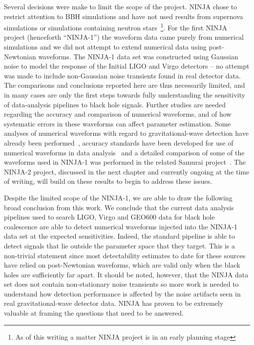 Several decisions were make to limit the scope of the project.  NINJA
chose to restrict attention to BBH simulations and have not used
results from supernova simulations or simulations containing neutron
stars~\footnote{As of this writing a matter NINJA project is in an
early planning stage}.  For the first NINJA project (henceforth
``NINJA-1'') the waveform data came purely from numerical simulations
and we did not attempt to extend numerical data using post-Newtonian
waveforms.  The NINJA-1 data set was constructed using Gaussian noise
to model the response of the Initial LIGO and Virgo detectors -- no
attempt was made to include non-Gaussian noise transients found in
real detector data.  The comparisons and conclusions reported here are
thus necessarily limited, and in many cases are only the first steps
towards fully understanding the sensitivity of data-analysis pipelines
to black hole signals.  Further studies are needed regarding the
accuracy and comparison of numerical waveforms, and of how systematic
errors in these waveforms can affect parameter estimation.  Some
analyses of numerical waveforms with regard to gravitational-wave
detection have already been
performed~\cite{Baumgarte:2006en,Vaishnav:2007nm,Pan:2007nw,Boyle:2009dg},
accuracy standards have been developed for use of numerical waveforms
in data analysis~\cite{Lindblom:2008cm} and a detailed comparison of
some of the waveforms used in NINJA-1 was performed in the related
Samurai project~\cite{Hannam:2009hh}.  The NINJA-2 project, discussed
in the next chapter and currently ongoing at the time of writing, will
build on these results to begin to address these issues.  

Despite the limited scope of the NINJA-1, we are able to draw the
following broad conclusion from this work.  We conclude that the
current data analysis pipelines used to search LIGO, Virgo and GEO600
data for black hole coalescence are able to detect numerical waveforms
injected into the NINJA-1 data set at the expected sensitivities.
Indeed, the standard pipeline is able to detect signals that lie
outside the parameter space that they target.  This is a non-trivial
statement since most detectability estimates to date for these sources
have relied on post-Newtonian waveforms, which are valid only when the
black holes are sufficiently far apart.  It should be noted, however,
that the NINJA data set does not contain non-stationary noise
transients so more work is needed to understand how detection
performance is affected by the noise artifacts seen in real
gravitational-wave detector data.  NINJA has proven to be extremely
valuable at framing the questions that need to be answered.

